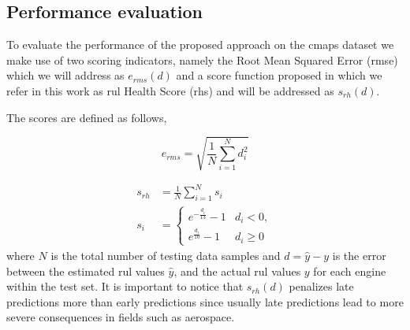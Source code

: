 \subsection{Performance evaluation}
\label{sec:rul_metrics}

To evaluate the performance of the proposed approach on the \gls{cmaps} dataset we make use of two scoring indicators, namely the Root Mean Squared Error (\gls{rmse}) which we will address as $e_{rms}(d)$ and a score function proposed in \cite{Saxena2008} which we refer in this work as \gls{rul} Health Score (\gls{rhs}) and will be addressed as $s_{rh}(d)$. 

\pagebreak

The scores are defined as follows,

\begin{equation}
e_{rms} = \sqrt{ \frac{1}{N} \sum_{i=1}^{N}{d_i^2}}
\label{eq:rmse}
\end{equation}

\begin{align}
s_{rh} &= \frac{1}{N} \sum_{i=1}^{N}{s_i} \nonumber \\
s_i &= \begin{cases} 
      e^{-\frac{d_i}{13}} - 1 & d_i < 0, \\
      e^{\frac{d_i}{10}} - 1 & d_i \geq 0
\end{cases}
\label{eq:rhs}
\end{align}
where $N$ is the total number of testing data samples and $d = \hat{y} - y$ is the error between the estimated \gls{rul} values $\hat{y}$, and the actual \gls{rul} values $y$ for each engine within the test set. It is important to notice that $s_{rh}(d)$ penalizes late predictions more than early predictions since usually late predictions lead to more severe consequences in fields such as aerospace.


